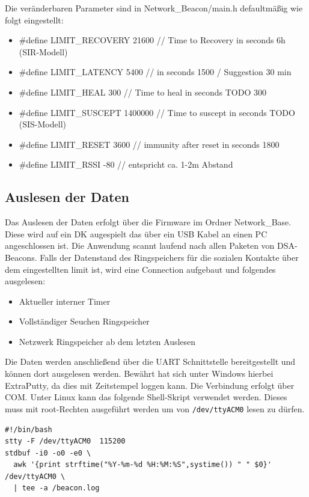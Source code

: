 \documentclass[11pt,ngerman]{scrartcl} %
\begin{document}
Die veränderbaren Parameter sind in Network\_Beacon/main.h defaultmäßig wie folgt eingestellt:
\begin{itemize}
\item \#define LIMIT\_RECOVERY				21600 // Time to Recovery in seconds     6h (SIR-Modell)
\item \#define LIMIT\_LATENCY				5400 //  in seconds 1500  / Suggestion 30 min
\item \#define LIMIT\_HEAL					300 // Time to heal in seconds TODO 300
\item \#define LIMIT\_SUSCEPT				1400000 // Time to suscept in seconds TODO (SIS-Modell)
\item \#define LIMIT\_RESET					3600 // immunity after reset in seconds 1800
\item \#define LIMIT\_RSSI		 			-80 // entspricht ca. 1-2m Abstand
\end{itemize}

\subsection{Auslesen der Daten}

Das Auslesen der Daten erfolgt über die Firmware im Ordner Network\_Base. Diese wird auf ein DK augespielt das über ein USB Kabel an einen PC angeschlossen ist. Die Anwendung scannt laufend nach allen Paketen von DSA-Beacons. Falls der Datenstand des Ringspeichers für die sozialen Kontakte über dem eingestellten limit ist, wird eine Connection aufgebaut und folgendes ausgelesen:
\begin{itemize}
\item Aktueller interner Timer
\item Vollständiger Seuchen Ringspeicher
\item Netzwerk Ringspeicher ab dem letzten Auslesen
\end{itemize}

Die Daten werden anschließend über die UART Schnittstelle bereitgestellt und können dort ausgelesen werden. Bewährt hat sich unter Windows hierbei ExtraPutty, da dies mit Zeitstempel loggen kann. Die Verbindung erfolgt über COM. Unter Linux kann das folgende Shell-Skript verwendet werden. Dieses muss mit root-Rechten ausgeführt werden um von \verb|/dev/ttyACM0| lesen zu dürfen.

\begin{verbatim}
#!/bin/bash
stty -F /dev/ttyACM0  115200
stdbuf -i0 -o0 -e0 \
  awk '{print strftime("%Y-%m-%d %H:%M:%S",systime()) " " $0}' /dev/ttyACM0 \
  | tee -a /beacon.log
\end{verbatim}
\end{document}
